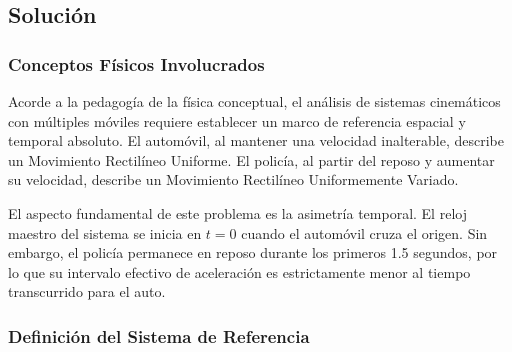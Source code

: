 \documentclass[12pt, a4paper]{article}
\begin{document}
\begin{center}
\end{center}

\subsection*{Solución}

\subsubsection*{Conceptos Físicos Involucrados}

Acorde a la pedagogía de la física conceptual, el análisis de sistemas cinemáticos con múltiples móviles requiere establecer un marco de referencia espacial y temporal absoluto. El automóvil, al mantener una velocidad inalterable, describe un Movimiento Rectilíneo Uniforme. El policía, al partir del reposo y aumentar su velocidad, describe un Movimiento Rectilíneo Uniformemente Variado. 

El aspecto fundamental de este problema es la asimetría temporal. El reloj maestro del sistema se inicia en $t = 0$ cuando el automóvil cruza el origen. Sin embargo, el policía permanece en reposo durante los primeros 1.5 segundos, por lo que su intervalo efectivo de aceleración es estrictamente menor al tiempo transcurrido para el auto.

\subsubsection*{Definición del Sistema de Referencia}
\end{document}
